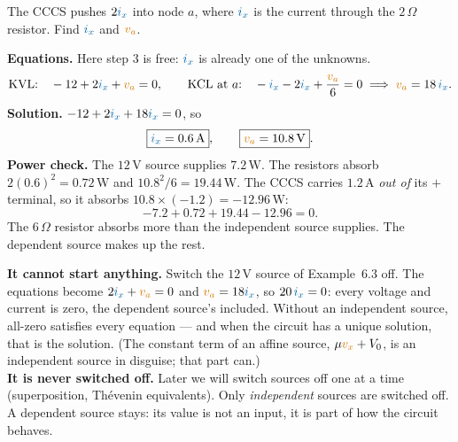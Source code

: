 \documentclass[11pt,a4paper]{article}
\newcommand{\Icol}[1]{\textcolor{ccur}{#1}}
\newcommand{\Vcol}[1]{\textcolor{cvolt}{#1}}
\newcommand{\uni}[1]{\,\mathrm{#1}}
\newcommand{\A}{\uni{A}}   \newcommand{\V}{\uni{V}}
\newcommand{\W}{\uni{W}}   \newcommand{\J}{\uni{J}}
\newcommand{\ohm}{\,\Omega}
\begin{document}
\begin{examplebox}
The CCCS pushes $2\Icol{i_x}$ into node $a$, where $\Icol{i_x}$ is the current through the
$2\ohm$ resistor. Find $\Icol{i_x}$ and $\Vcol{v_a}$.

\begin{center}
\end{center}

\textbf{Equations.} Here step 3 is free: $\Icol{i_x}$ is already one of the unknowns.
\[
  \text{KVL:}\quad -12 + 2\Icol{i_x} + \Vcol{v_a} = 0,
  \qquad
  \text{KCL at } a\text{:}\quad -\Icol{i_x} - 2\Icol{i_x} + \frac{\Vcol{v_a}}{6} = 0
  \;\Longrightarrow\; \Vcol{v_a} = 18\,\Icol{i_x} .
\]
\textbf{Solution.} $-12 + 2\Icol{i_x} + 18\Icol{i_x} = 0$, so
\[
  \boxed{\Icol{i_x} = 0.6\A}, \qquad \boxed{\Vcol{v_a} = 10.8\V}.
\]
\textbf{Power check.} The $12\V$ source supplies $7.2\W$. The resistors absorb
$2(0.6)^2 = 0.72\W$ and $10.8^2/6 = 19.44\W$. The CCCS carries $1.2\A$ \emph{out of} its $+$
terminal, so it absorbs $10.8 \times (-1.2) = -12.96\W$:
\[
  -7.2 + 0.72 + 19.44 - 12.96 = 0 .
\]
The $6\ohm$ resistor absorbs more than the independent source supplies. The dependent source
makes up the rest.
\end{examplebox}

\begin{cautionbox}
\textbf{It cannot start anything.} Switch the $12\V$ source of Example~6.3 off. The equations
become $2\Icol{i_x} + \Vcol{v_a} = 0$ and $\Vcol{v_a} = 18\Icol{i_x}$, so
$20\,\Icol{i_x} = 0$: every voltage and current is zero, the dependent source's included.
Without an independent source, all-zero satisfies every equation --- and when the circuit has
a unique solution, that is the solution. (The constant term of an affine source,
$\mu\Vcol{v_x} + V_0$, is an independent source in disguise; that part can.)\\[3pt]
\textbf{It is never switched off.} Later we will switch sources off one at a time
(superposition, Thévenin equivalents). Only \emph{independent} sources are switched off. A
dependent source stays: its value is not an input, it is part of how the circuit behaves.
\end{cautionbox}
\end{document}
